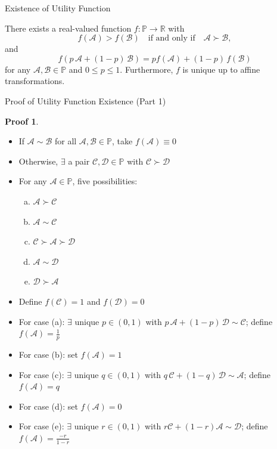 \documentclass[10pt,handout]{beamer}
\newcommand{\ds}{\displaystyle}
\theoremstyle{definition}
\newtheorem*{prf}{Proof}
\begin{document}
\begin{frame}{Existence of Utility Function}
  \begin{theorem}
    There exists a real-valued function $f : \mathbb{P} \to \mathbb{R}$ with
    \[f(\mathcal{A}) > f(\mathcal{B}) \quad \text{if and only if} \quad \mathcal{A} \succ \mathcal{B},\]
    and
    \[f(p\,\mathcal{A} + (1-p)\,\mathcal{B}) = pf(\mathcal{A}) + (1-p)\,f(\mathcal{B})\]
    for any $\mathcal{A}, \mathcal{B} \in \mathbb{P}$ and $0 \leqslant p \leqslant 1$. Furthermore, $f$ is unique up to affine transformations.
  \end{theorem}
\end{frame}

\begin{frame}{Proof of Utility Function Existence (Part 1)}
  \begin{prf}
    \begin{itemize}[<+->]
      \item If $\mathcal{A} \sim \mathcal{B}$ for all $\mathcal{A}, \mathcal{B} \in \mathbb{P}$, take $f(\mathcal{A}) \equiv 0$
      \item Otherwise, $\exists$ a pair $\mathcal{C}, \mathcal{D} \in \mathbb{P}$ with $\mathcal{C} \succ \mathcal{D}$
      \item For any $\mathcal{A} \in \mathbb{P}$, five possibilities:
        \vspace{-3mm}
        \begin{multicols}{3}
        \begin{enumerate}[(a)]
          \item $\mathcal{A} \succ \mathcal{C}$
          \item $\mathcal{A} \sim \mathcal{C}$
          \item $\mathcal{C} \succ \mathcal{A} \succ \mathcal{D}$
          \item $\mathcal{A} \sim \mathcal{D}$
          \item $\mathcal{D} \succ \mathcal{A}$
        \end{enumerate}
      \end{multicols}
      \vspace{-3mm}
      \item Define $f(\mathcal{C}) = 1$ and $f(\mathcal{D}) = 0$
      \item For case (a): $\exists$ unique $p \in (0, 1)$ with $p\,\mathcal{A} + (1-p)\,\mathcal{D} \sim \mathcal{C}$; define $\ds f(\mathcal{A}) = \frac{1}{p}$
      \item For case (b): set $f(\mathcal{A}) = 1$
      \item For case (c): $\exists$ unique $q \in (0, 1)$ with $q\,\mathcal{C} + (1-q)\,\mathcal{D} \sim \mathcal{A}$; define $f(\mathcal{A}) = q$
      \item For case (d): set $f(\mathcal{A}) = 0$
      \item For case (e): $\exists$ unique $r \in (0, 1)$ with $r\mathcal{C} + (1-r)\mathcal{A} \sim \mathcal{D}$; define $\ds f(\mathcal{A}) = \frac{-r}{1-r}$
    \end{itemize}
  \end{prf}
\end{frame}
\end{document}

